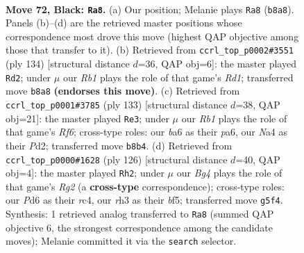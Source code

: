 \documentclass[11pt]{article}
\begin{document}
\clearpage

\begin{figure}[p]\centering
\begin{subfigure}{0.46\textwidth}\centering
\resizebox{\linewidth}{!}{%
\newchessgame
\chessboard[
  setfen={1r6/2B5/B2p1k1p/4p1b1/n3P2p/5P1R/4K3/8 b - - 14 72},
  showmover=false,
  pgfstyle=straightmove, color=movearrow, markmove={b8-a8}
]}
\caption{}
\end{subfigure}\hfill
\begin{subfigure}{0.46\textwidth}\centering
\resizebox{\linewidth}{!}{%
\newchessgame
\chessboard[
  setfen={8/8/6pk/7p/7P/4rPPK/5bB1/3R4 w - - 8 68},
  showmover=false,
  pgfstyle=straightmove, color=movearrow, markmove={d1-d2}
]}
\caption{}
\end{subfigure}
\\[4pt]
\begin{subfigure}{0.46\textwidth}\centering
\resizebox{\linewidth}{!}{%
\newchessgame
\chessboard[
  setfen={8/5pk1/P7/1K2p1p1/4P1P1/2b2r2/R2pB3/8 b - - 1 67},
  showmover=false,
  pgfstyle=straightmove, color=movearrow, markmove={f3-e3}
]}
\caption{}
\end{subfigure}\hfill
\begin{subfigure}{0.46\textwidth}\centering
\resizebox{\linewidth}{!}{%
\newchessgame
\chessboard[
  setfen={8/7p/5B2/1p3bP1/p1r5/P4k2/1KP3R1/8 w - - 34 64},
  showmover=false,
  pgfstyle=straightmove, color=movearrow, markmove={g2-h2}
]}
\caption{}
\end{subfigure}
\caption{\textbf{Move 72, Black: \texttt{Ra8}.} (a) Our position; Melanie plays \texttt{Ra8} (\texttt{b8a8}). Panels (b)--(d) are the retrieved master positions whose correspondence most drove this move (highest QAP objective among those that transfer to it). (b) Retrieved from \texttt{ccrl\_top\_p0002\#3551} (ply 134) [structural distance $d$=36, QAP obj=6]: the master played \texttt{Rd2}; under $\mu$ our \emph{Rb1} plays the role of that game's \emph{Rd1}; transferred move \texttt{b8a8} \textbf{(endorses this move)}. (c) Retrieved from \texttt{ccrl\_top\_p0001\#3785} (ply 133) [structural distance $d$=38, QAP obj=21]: the master played \texttt{Re3}; under $\mu$ our \emph{Rb1} plays the role of that game's \emph{Rf6}; cross-type roles: our \emph{b}a6 as their \emph{p}a6, our \emph{N}a4 as their \emph{P}d2; transferred move \texttt{b8b4}. (d) Retrieved from \texttt{ccrl\_top\_p0000\#1628} (ply 126) [structural distance $d$=40, QAP obj=4]: the master played \texttt{Rh2}; under $\mu$ our \emph{Bg4} plays the role of that game's \emph{Rg2} (a \textbf{cross-type} correspondence); cross-type roles: our \emph{P}d6 as their \emph{r}c4, our \emph{r}h3 as their \emph{b}f5; transferred move \texttt{g5f4}. Synthesis: 1 retrieved analog transferred to \texttt{Ra8} (summed QAP objective 6, the strongest correspondence among the candidate moves); Melanie committed it via the \texttt{search} selector.}
\label{fig:thought-m143}
\end{figure}
\end{document}
